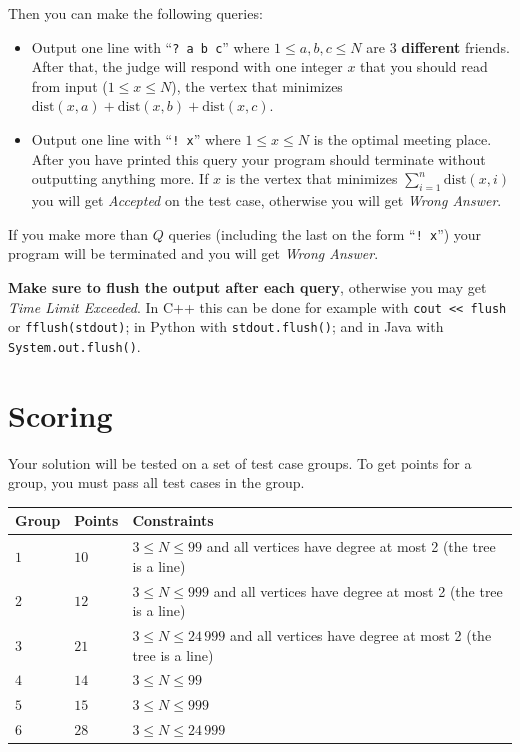 Then you can make the following queries:
\begin{itemize}
  \item Output one line with ``\verb|? a b c|'' where $1\le a,b,c\le N$ are $3$ \textbf{different} friends.
    After that, the judge will respond with one integer $x$ that you should read from input
    ($1\le x\le N$), the vertex that minimizes $\text{dist}(x,a) +\text{dist}(x,b) +\text{dist}(x,c)$.
  \item Output one line with ``\verb|! x|'' where $1\le x\le N$ is the optimal meeting place.
    After you have printed this query your program should terminate without outputting anything more. 
    If $x$ is the vertex that minimizes $\sum_{i=1}^{n} \text{dist}(x,i)$ you will get \textit{Accepted} on the test case, otherwise you will get \textit{Wrong Answer}.
\end{itemize}
If you make more than $Q$ queries (including the last on the form ``\verb|! x|'')
your program will be terminated and you will get \textit{Wrong Answer}.

\textbf{Make sure to flush the output after each query}, otherwise you may get \textit{Time Limit Exceeded}.
In C++ this can be done for example with \texttt{cout << flush}
or \texttt{fflush(stdout)};
in Python with \texttt{stdout.flush()};
and in Java with \texttt{System.out.flush()}.

\section*{Scoring}
Your solution will be tested on a set of test case groups.
To get points for a group, you must pass all test cases in the group.


\noindent
\begin{tabular}{| l | l | l |}
  \hline
  Group & Points & Constraints \\ \hline
  $1$   & $10$        & $3 \le N\le 99$ and all vertices have degree at most 2 (the tree is a line) \\ \hline
  $2$   & $12$        & $3 \le N\le 999$ and all vertices have degree at most 2 (the tree is a line) \\ \hline
  $3$   & $21$        & $3 \le N\le 24\,999$ and all vertices have degree at most 2 (the tree is a line) \\ \hline \hline
  $4$   & $14$        & $3 \le N\le 99$ \\ \hline
  $5$   & $15$        & $3 \le N\le 999$ \\ \hline
  $6$   & $28$        & $3 \le N\le 24\,999$ \\ \hline
\end{tabular}
